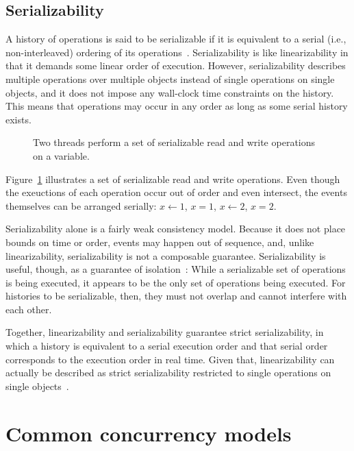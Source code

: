 \documentclass{sig-alternate}
\begin{document}
\subsection{Serializability}

A history of operations is said to be serializable if it is equivalent to a serial (i.e., non-interleaved) ordering of its operations~\cite{Herlihy1990}. Serializability is like linearizability in that it demands some linear order of execution. However, serializability describes multiple operations over multiple objects instead of single operations on single objects, and it does not impose any wall-clock time constraints on the history. This means that operations may occur in any order as long as some serial history exists.

\begin{figure}[h]
  \centering
  \resizebox{0.63\linewidth}{!}{}
  \caption{Two threads perform a set of serializable read and write operations on a variable.}
\label{figure:serializability}
\end{figure}

Figure~\ref{figure:serializability} illustrates a set of serializable read and write operations. Even though the exeuctions of each operation occur out of order and even intersect, the events themselves can be arranged serially: $x \leftarrow 1$, $x = 1$, $x \leftarrow 2$, $x = 2$.

Serializability alone is a fairly weak consistency model. Because it does not place bounds on time or order, events may happen out of sequence, and, unlike linearizability, serializability is not a composable guarantee. Serializability is useful, though, as a guarantee of isolation~\cite{Haerder1983}: While a serializable set of operations is being executed, it appears to be the only set of operations being executed. For histories to be serializable, then, they must not overlap and cannot interfere with each other.

Together, linearizability and serializability guarantee strict serializability, in which a history is equivalent to a serial execution order and that serial order corresponds to the execution order in real time. Given that, linearizability can actually be described as strict serializability restricted to single operations on single objects~\cite{Herlihy1990}.

\section{Common concurrency models}
\end{document}
